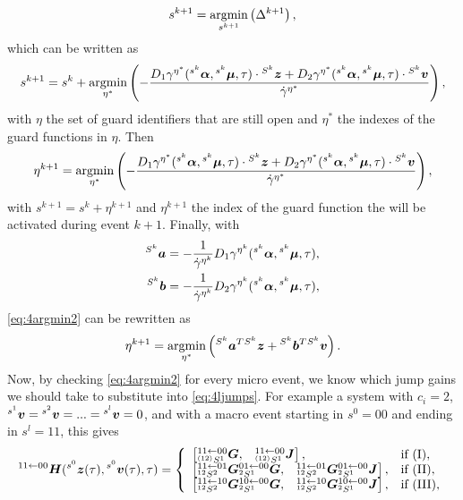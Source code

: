 \documentclass[../DC2017114Bouma.tex]{subfiles}
\begin{document}
\begin{align}
s^{k+1} = \underset{s^{k+1}}{\operatorname{\text{argmin}}}\left(\Delta^{k+1}\right),
\end{align}
which can be written as
\begin{align}
s^{k+1} = s^k + \underset{\eta^*}{\operatorname{\text{argmin}}}\left(-\frac{D_1\gamma^{\eta^*}(\hspace{0cm}^{s^k}\boldsymbol{\alpha},\hspace{0cm}^{s^k}\boldsymbol{\mu},\tau)\cdot\hspace{0cm}^{S^k}{\boldsymbol{z}} + D_2\gamma^{\eta^*}(\hspace{0cm}^{s^k}\boldsymbol{\alpha},\hspace{0cm}^{s^k}\boldsymbol{\mu},\tau)\cdot\hspace{0cm}^{S^k}{\boldsymbol{v}}}{\dot{\gamma}^{\eta^*}}\right),
\end{align}
with $\eta$ the set of guard identifiers that are still open and $\eta^*$ the indexes of the guard functions in $\eta$. Then
\begin{align}
\eta^{k+1} = \underset{\eta^*}{\operatorname{\text{argmin}}}\left(-\frac{D_1\gamma^{\eta^*}(\hspace{0cm}^{s^k}\boldsymbol{\alpha},\hspace{0cm}^{s^k}\boldsymbol{\mu},\tau)\cdot\hspace{0cm}^{S^k}{\boldsymbol{z}} + D_2\gamma^{\eta^*}(\hspace{0cm}^{s^k}\boldsymbol{\alpha},\hspace{0cm}^{s^k}\boldsymbol{\mu},\tau)\cdot\hspace{0cm}^{S^k}{\boldsymbol{v}}}{\dot{\gamma}^{\eta^*}}\right),\label{eq:4argmin2}
\end{align}
with $s^{k+1} = s^k + \eta^{k+1}$ and $\eta^{k+1}$ the index of the guard function the will be activated during event $k+1$. Finally, with
\begin{align*}
\hspace{0cm}^{S^k}{\boldsymbol{a}} &= -\frac{1}{\dot{\gamma}^{\eta^k}}D_1\gamma^{\eta^k}(\hspace{0cm}^{s^k}\boldsymbol{\alpha},\hspace{0cm}^{s^k}\boldsymbol{\mu},\tau),\\
\hspace{0cm}^{S^k}{\boldsymbol{b}} &= -\frac{1}{\dot{\gamma}^{\eta^k}}D_2\gamma^{\eta^k}(\hspace{0cm}^{s^k}\boldsymbol{\alpha},\hspace{0cm}^{s^k}\boldsymbol{\mu},\tau),
\end{align*}
\eqref{eq:4argmin2} can be rewritten as
\begin{align}
\eta^{k+1} = \underset{\eta^*}{\operatorname{\text{argmin}}}\left(\hspace{0cm}^{S^k}{\boldsymbol{a}}^T\hspace{0cm}^{S^k}{\boldsymbol{z}} +\hspace{0cm}^{S^k}{\boldsymbol{b}}^T\hspace{0cm}^{S^k}{\boldsymbol{v}}\right).
\end{align}
Now, by checking \eqref{eq:4argmin2} for every micro event, we know which jump gains we should take to substitute into \eqref{eq:4ljumps}.
For example a system with $c_i = 2$, $\hspace{0cm}^{s^1}{\boldsymbol{v}}=\hspace{0cm}^{s^2}{\boldsymbol{v}}=...=\hspace{0cm}^{s^l}{\boldsymbol{v}}=0$, and with a macro event starting in $s^0 = 00$ and ending in $s^l = 11$, this gives 
\begin{align}
\hspace{0cm}^{11\leftarrow 00}{\boldsymbol{H}}(\hspace{0cm}^{s^0}{\boldsymbol{z}}(\tau),\hspace{0cm}^{s^0}{\boldsymbol{v}}(\tau),\tau) = \left\lbrace\begin{array}{ll}
\begin{bmatrix}\hspace{0cm}^{11\leftarrow 00}_{\hspace{0cm}^{(12)}S^1}{\boldsymbol{G}}, & \hspace{0cm}^{11\leftarrow 00}_{\hspace{0cm}^{(12)}S^1}{\boldsymbol{J}}\end{bmatrix}, & \text{if }(\text{I}),\\
\begin{bmatrix}\hspace{0cm}^{11\leftarrow 01}_{\hspace{0cm}^{12}S^2}{\boldsymbol{G}} \hspace{0cm}^{01\leftarrow 00}_{\hspace{0cm}^{2}S^1}{\boldsymbol{G}}, & \hspace{0cm}^{11\leftarrow 01}_{\hspace{0cm}^{12}S^2}{\boldsymbol{G}} \hspace{0cm}^{01\leftarrow 00}_{\hspace{0cm}^{2}S^1}{\boldsymbol{J}}\end{bmatrix}, & \text{if }(\text{II}),\\
\begin{bmatrix}\hspace{0cm}^{11\leftarrow 10}_{\hspace{0cm}^{12}S^2}{\boldsymbol{G}} \hspace{0cm}^{10\leftarrow 00}_{\hspace{0cm}^{2}S^1}{\boldsymbol{G}}, & \hspace{0cm}^{11\leftarrow 10}_{\hspace{0cm}^{12}S^2}{\boldsymbol{G}} \hspace{0cm}^{10\leftarrow 00}_{\hspace{0cm}^{2}S^1}{\boldsymbol{J}}\end{bmatrix}, & \text{if }(\text{III}),
\end{array}\right.\label{eq:4H2200}
\end{align}
\end{document}
